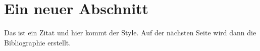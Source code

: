 \documentclass[11pt]{article}
\begin{document}
\section{Ein neuer Abschnitt}
Das ist ein Zitat und hier kommt der Style.\cite[see][chap 2]{karotten} Auf der nächsten Seite wird dann die Bibliographie erstellt.


\end{document}
